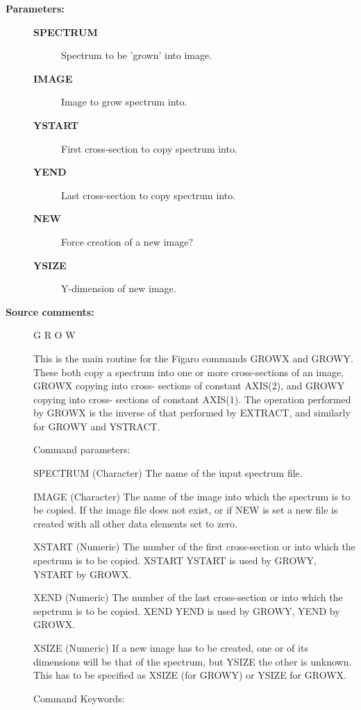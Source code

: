 \begin{description}
\begin{description}
\item [\textbf{Parameters:}]
\begin{description}
\item [\textbf{SPECTRUM}]
 Spectrum to be 'grown' into image.
\item [\textbf{IMAGE}]
 Image to grow spectrum into.
\item [\textbf{YSTART}]
 First cross-section to copy spectrum into.
\item [\textbf{YEND}]
 Last cross-section to copy spectrum into.
\item [\textbf{NEW}]
 Force creation of a new image?
\item [\textbf{YSIZE}]
 Y-dimension of new image.
\end{description}

\item [\textbf{Source comments:}]
\begin{terminalv}
 G R O W

 This is the main routine for the Figaro commands GROWX
 and GROWY.  These both copy a spectrum into one or more
 cross-sections of an image, GROWX copying into cross-
 sections of constant AXIS(2), and GROWY copying into cross-
 sections of constant AXIS(1).  The operation performed by GROWX
 is the inverse of that performed by EXTRACT, and similarly
 for GROWY and YSTRACT.

 Command parameters:

 SPECTRUM    (Character) The name of the input spectrum file.

 IMAGE       (Character) The name of the image into which the
             spectrum is to be copied.  If the image file does
             not exist, or if NEW is set a new file is created
             with all other data elements set to zero.

 XSTART      (Numeric) The number of the first cross-section
   or        into which the spectrum is to be copied.  XSTART
 YSTART      is used by GROWY, YSTART by GROWX.

 XEND        (Numeric) The number of the last cross-section
   or        into which the sepctrum is to be copied.  XEND
 YEND        is used by GROWY, YEND by GROWX.

 XSIZE       (Numeric) If a new image has to be created, one
   or        of its dimensions will be that of the spectrum, but
 YSIZE       the other is unknown.  This has to be specified as
             XSIZE (for GROWY) or YSIZE for GROWX.

 Command Keywords:


\end{terminalv}
\end{description}
\end{description}
